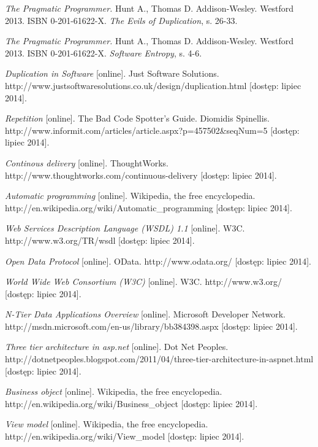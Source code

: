 \begin{thebibliography}{}

  \emph{The Pragmatic Programmer.}
  Hunt A., Thomas D.
  Addison-Wesley.
  Westford 2013.
  ISBN 0-201-61622-X.
  \emph{The Evils of Duplication}, s. 26-33.
 
  \emph{The Pragmatic Programmer.}
  Hunt A., Thomas D.
  Addison-Wesley.
  Westford 2013.
  ISBN 0-201-61622-X.
  \emph{Software Entropy}, s. 4-6.
 
  \emph{Duplication in Software} [online].
  Just Software Solutions.
  http://www.justsoftwaresolutions.co.uk/design/duplication.html [dostęp: lipiec 2014].
  
  \emph{Repetition} [online].
  The Bad Code Spotter's Guide.
  Diomidis Spinellis.
  http://www.informit.com/articles/article.aspx?p=457502\&seqNum=5 [dostęp: lipiec 2014].
 
  \emph{Continous delivery} [online].
  ThoughtWorks.
  http://www.thoughtworks.com/continuous-delivery [dostęp: lipiec 2014].
 
  \emph{Automatic programming} [online].
  Wikipedia, the free encyclopedia.
  http://en.wikipedia.org/wiki/Automatic\_programming [dostęp: lipiec 2014].
 
  \emph{Web Services Description Language (WSDL) 1.1} [online].
  W3C.
  http://www.w3.org/TR/wsdl [dostęp: lipiec 2014].
 
  \emph{Open Data Protocol} [online].
  OData.
  http://www.odata.org/ [dostęp: lipiec 2014].
 
  \emph{World Wide Web Consortium (W3C)} [online].
  W3C.
  http://www.w3.org/ [dostęp: lipiec 2014].
 
  \emph{N-Tier Data Applications Overview} [online].
  Microsoft Developer Network.
  http://msdn.microsoft.com/en-us/library/bb384398.aspx [dostęp: lipiec 2014].
 
  \emph{Three tier architecture in asp.net} [online].
  Dot Net Peoples.
  http://dotnetpeoples.blogspot.com/2011/04/three-tier-architecture-in-aspnet.html [dostęp: lipiec 2014].

  \emph{Business object} [online].
  Wikipedia, the free encyclopedia.
  http://en.wikipedia.org/wiki/Business\_object [dostęp: lipiec 2014].
  
  \emph{View model} [online].
  Wikipedia, the free encyclopedia.
  http://en.wikipedia.org/wiki/View\_model [dostęp: lipiec 2014].
 

\end{thebibliography}
